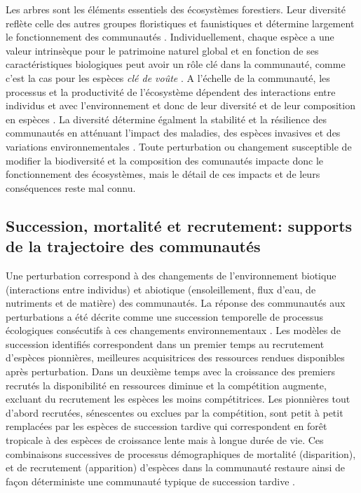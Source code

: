 \documentclass[
  11pt,
  french,
  A4paper,
  extrafontsizes,onecolumn,openright
  ]{memoir}
\begin{document}
Les arbres sont les éléments essentiels des écosystèmes forestiers. Leur
diversité reflète celle des autres groupes floristiques et faunistiques
et détermine largement le fonctionnement des communautés
\autocite{Guitet2017}. Individuellement, chaque espèce a une valeur
intrinsèque pour le patrimoine naturel global et en fonction de ses
caractéristiques biologiques peut avoir un rôle clé dans la communauté,
comme c'est la cas pour les espèces \emph{clé de voûte}
\autocites{Jones1994}{Power1996}{Gardner2007}. A l'échelle de la
communauté, les processus et la productivité de l'écosystème dépendent
des interactions entre individus et avec l'environnement et donc de leur
diversité et de leur composition en espèces \autocite{Begon2006}. La
diversité détermine égalment la stabilité et la résilience des
communautés en atténuant l'impact des maladies, des espèces invasives et
des variations environnementales \autocite{Elmqvist2003}. Toute
perturbation ou changement susceptible de modifier la biodiversité et la
composition des comunautés impacte donc le fonctionnement des
écosystèmes, mais le détail de ces impacts et de leurs conséquences
reste mal connu.

\subsection{Succession, mortalité et recrutement: supports de la
trajectoire des
communautés}\label{succession-mortalite-et-recrutement-supports-de-la-trajectoire-des-communautes}

Une perturbation correspond à des changements de l'environnement
biotique (interactions entre individus) et abiotique (ensoleillement,
flux d'eau, de nutriments et de matière) des communautés. La réponse des
communautés aux perturbations a été décrite comme une succession
temporelle de processus écologiques consécutifs à ces changements
environnementaux \autocite{Clements1916}. Les modèles de succession
identifiés correspondent dans un premier temps au recrutement d'espèces
pionnières, meilleures acquisitrices des ressources rendues disponibles
après perturbation. Dans un deuxième temps avec la croissance des
premiers recrutés la disponibilité en ressources diminue et la
compétition augmente, excluant du recrutement les espèces les moins
compétitrices. Les pionnières tout d'abord recrutées, sénescentes ou
exclues par la compétition, sont petit à petit remplacées par les
espèces de succession tardive qui correspondent en forêt tropicale à des
espèces de croissance lente mais à longue durée de vie. Ces combinaisons
successives de processus démographiques de mortalité (disparition), et
de recrutement (apparition) d'espèces dans la communauté restaure ainsi
de façon déterministe une communauté typique de succession tardive
\autocite{Denslow2000}.
\end{document}
